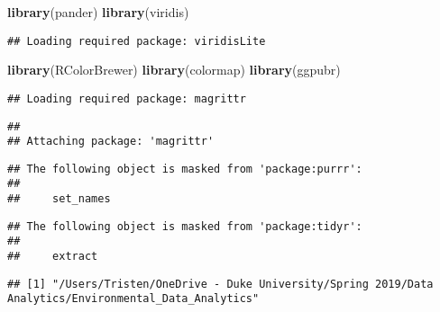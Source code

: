 \documentclass[]{article}
\newenvironment{Shaded}{\begin{snugshade}}{\end{snugshade}}
\newcommand{\KeywordTok}[1]{\textcolor[rgb]{0.13,0.29,0.53}{\textbf{#1}}}
\newcommand{\DataTypeTok}[1]{\textcolor[rgb]{0.13,0.29,0.53}{#1}}
\newcommand{\DecValTok}[1]{\textcolor[rgb]{0.00,0.00,0.81}{#1}}
\newcommand{\StringTok}[1]{\textcolor[rgb]{0.31,0.60,0.02}{#1}}
\newcommand{\CommentTok}[1]{\textcolor[rgb]{0.56,0.35,0.01}{\textit{#1}}}
\newcommand{\OperatorTok}[1]{\textcolor[rgb]{0.81,0.36,0.00}{\textbf{#1}}}
\newcommand{\NormalTok}[1]{#1}
\begin{document}
\begin{Shaded}
\begin{Highlighting}[]
\KeywordTok{library}\NormalTok{(pander)}
\KeywordTok{library}\NormalTok{(viridis)}
\end{Highlighting}
\end{Shaded}

\begin{verbatim}
## Loading required package: viridisLite
\end{verbatim}

\begin{Shaded}
\begin{Highlighting}[]
\KeywordTok{library}\NormalTok{(RColorBrewer)}
\KeywordTok{library}\NormalTok{(colormap)}
\KeywordTok{library}\NormalTok{(ggpubr)}
\end{Highlighting}
\end{Shaded}

\begin{verbatim}
## Loading required package: magrittr
\end{verbatim}

\begin{verbatim}
## 
## Attaching package: 'magrittr'
\end{verbatim}

\begin{verbatim}
## The following object is masked from 'package:purrr':
## 
##     set_names
\end{verbatim}

\begin{verbatim}
## The following object is masked from 'package:tidyr':
## 
##     extract
\end{verbatim}

\begin{Shaded}
\end{Shaded}

\begin{verbatim}
## [1] "/Users/Tristen/OneDrive - Duke University/Spring 2019/Data Analytics/Environmental_Data_Analytics"
\end{verbatim}

\begin{Shaded}
\end{Shaded}
\end{document}

